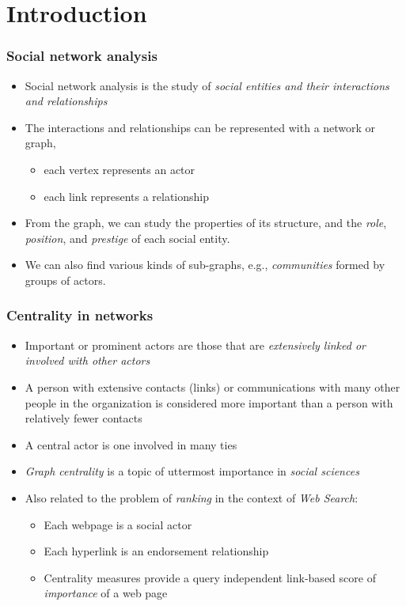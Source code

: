 \section{Introduction}

\begin{frame}
  \frametitle{Social network analysis}
  \begin{itemize}
    \item Social network analysis is the study of \emph{social entities and
      their interactions and relationships}
      \pause \item The interactions and relationships can be represented with a network or graph,
      \begin{itemize}
        \pause  \item each vertex represents an actor
        \pause  \item each link represents a relationship
    \end{itemize}
    \pause \item From the graph, we can study the properties of its structure,
    and the \emph{role}, \emph{position}, and \emph{prestige} of each social entity.
    \pause\item We can also find various kinds of sub-graphs, e.g.,
    \emph{communities} formed by groups of actors.
\end{itemize}
\end{frame}

\begin{frame}
  \frametitle{Centrality in networks}
  \begin{itemize}
    \item Important or prominent actors are those that are \emph{extensively
      linked or involved with other actors}
    \item A person with extensive contacts (links) or communications
      with many other people in the organization is considered more important
      than a person with relatively fewer contacts
    \pause
    \item A central actor is one involved in many ties
    \pause
    \item \emph{Graph centrality} is a topic of uttermost importance in
      \emph{social sciences}
    \pause
    \item Also related to the problem of \emph{ranking} in the context of
      \emph{Web Search}:
      \begin{itemize}
        \item Each webpage is a social actor
        \item Each hyperlink is an endorsement relationship
        \item Centrality measures provide a query independent link-based score
          of \emph{importance} of a web page
      \end{itemize}
  \end{itemize}
\end{frame}

